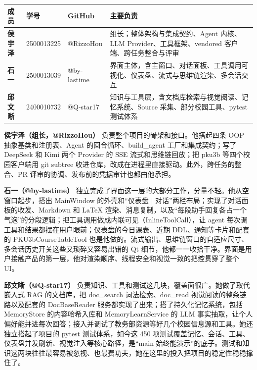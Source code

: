 \documentclass[UTF8,a4paper,11pt,fontset=none]{ctexart}
\newcommand{\code}[1]{{\ttfamily\small #1}}
\begin{document}
\begin{center}
\small
\begin{tabular}{@{}>{\bfseries}l l l p{7.6cm}@{}}
\toprule
\rowcolor{seambg}\textbf{成员} & \textbf{学号} & \textbf{GitHub} & \textbf{主要负责} \\
\midrule
侯宇泽 & 2500013225 & @RizzoHou & 组长；整体架构与集成契约、Agent 内核、LLM Provider、工具框架、vendored 客户端、跨任务整合与评审 \\
石一 & 2500013039 & @by-lastime & 界面主体，含主窗口、对话面板、工具调用可视化、仪表盘、流式与思维链渲染、多会话交互 \\
邱文晰 & 2400010732 & @Q-star17 & 知识与工具层，含文档库检索与视觉阅读、记忆系统、Source 采集、部分校园工具、pytest 测试体系 \\
\bottomrule
\end{tabular}
\end{center}

\textbf{侯宇泽（组长，@RizzoHou）} 负责整个项目的骨架和接口。他搭起四条 OOP 抽象基类和注册表、Agent 的回合循环、\code{build\_agent} 工厂和集成契约；写了 DeepSeek 和 Kimi 两个 Provider 的 SSE 流式和思维链回放；把 pku3b 等四个校园客户端用 git subtree 收进仓库，改成在进程里直接驱动。此外，跨任务的整合、PR 评审的协调、发布前的凭据审计也都由他承担。

\textbf{石一（@by-lastime）} 独立完成了界面这一层的大部分工作，分量不轻。他从空窗口起步，搭出 \code{MainWindow} 的外壳和“仪表盘 | 对话”两栏布局；实现了对话面板的收发、Markdown 和 LaTeX 渲染、消息复制，以及“每段助手回复各占一个气泡”的分段逻辑；把工具调用做成内联可见（\code{InlineToolCall}），让 agent 每次调工具和结果都摆在用户眼前；仪表盘的今日课表、近期 DDL、通知等卡片和配套的 \code{PKU3bCourseTableTool} 也是他做的。流式输出、思维链窗口的自适应尺寸、多会话历史开关这些又琐碎又容易出错的 Qt 细节，他都一一收拾干净。界面是用户接触产品的第一层，他对渲染顺序、线程安全和视觉一致的把控贯穿了整个 UI。

\textbf{邱文晰（@Q-star17）} 负责知识、工具和测试这几块，覆盖面很广。她做了取代嵌入式 RAG 的文档库，把 \code{doc\_search} 词法检索、\code{doc\_read} 视觉阅读的整条链路以及配套的 \code{DocBaseReader} 服务都实现了出来；搭了持久化记忆系统，包括 \code{MemoryStore} 的内容哈希入库和 \code{MemoryLearnService} 的 LLM 事实抽取，让个人偏好能并进每次回答；接入并调试了教务部资源等好几个校园信息源和工具。她还独立搭起了项目的 pytest 测试体系，如今这 450 项测试覆盖记忆、会话、工具、仪表盘并发刷新、视觉注入等核心路径，是“main 始终能演示”的底子。测试和知识这两块往往最容易被忽视、也最费功夫，她在这里的投入把项目的稳定性稳稳撑住了。
\end{document}
